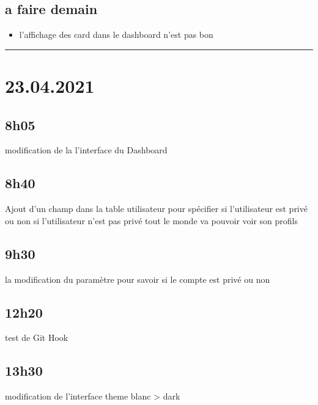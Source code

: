 \documentclass[a4paper,12pt,french]{sphinxmanual}
\begin{document}
\subsection{a faire demain}
\label{\detokenize{logbook:a-faire-demain}}\begin{itemize}
\item {} 
\sphinxAtStartPar
l’affichage des card dans le dashboard n’est pas bon

\end{itemize}


\bigskip\hrule\bigskip



\section{23.04.2021}
\label{\detokenize{logbook:id19}}

\subsection{8h05}
\label{\detokenize{logbook:id20}}
\sphinxAtStartPar
modification de la l’interface du Dashboard


\subsection{8h40}
\label{\detokenize{logbook:id21}}
\sphinxAtStartPar
Ajout d’un champ dans la table utilisateur pour spécifier si l’utilisateur est privé ou non
si l’utilisateur n’est pas privé tout le monde va pouvoir voir son profils


\subsection{9h30}
\label{\detokenize{logbook:id22}}
\sphinxAtStartPar
la modification du paramètre pour savoir si le compte est privé ou non


\subsection{12h20}
\label{\detokenize{logbook:id23}}
\sphinxAtStartPar
test de Git Hook


\subsection{13h30}
\label{\detokenize{logbook:id24}}
\sphinxAtStartPar
modification de l’interface theme blanc \sphinxhyphen{}> dark
\end{document}
